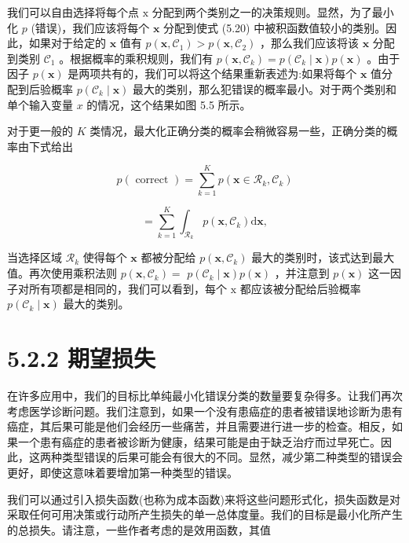 \documentclass[10pt]{article}
\begin{document}
我们可以自由选择将每个点 \(\mathrm{x}\) 分配到两个类别之一的决策规则。显然，为了最小化 \(p\) (错误)，我们应该将每个 \(\mathbf{x}\) 分配到使式 (5.20) 中被积函数值较小的类别。因此，如果对于给定的 \(\mathbf{x}\) 值有 \(p\left( {\mathbf{x},{\mathcal{C}}_{1}}\right)  > p\left( {\mathbf{x},{\mathcal{C}}_{2}}\right)\) ，那么我们应该将该 \(\mathbf{x}\) 分配到类别 \({\mathcal{C}}_{1}\) 。根据概率的乘积规则，我们有 \(p\left( {\mathbf{x},{\mathcal{C}}_{k}}\right)  = p\left( {{\mathcal{C}}_{k} \mid  \mathbf{x}}\right) p\left( \mathbf{x}\right)\) 。由于因子 \(p\left( \mathbf{x}\right)\) 是两项共有的，我们可以将这个结果重新表述为:如果将每个 \(\mathbf{x}\) 值分配到后验概率 \(p\left( {{\mathcal{C}}_{k} \mid  \mathbf{x}}\right)\) 最大的类别，那么犯错误的概率最小。对于两个类别和单个输入变量 \(x\) 的情况，这个结果如图 5.5 所示。

对于更一般的 \(K\) 类情况，最大化正确分类的概率会稍微容易一些，正确分类的概率由下式给出

\[
p\left( \text{ correct }\right)  = \mathop{\sum }\limits_{{k = 1}}^{K}p\left( {\mathbf{x} \in  {\mathcal{R}}_{k},{\mathcal{C}}_{k}}\right)
\]

\[
= \mathop{\sum }\limits_{{k = 1}}^{K}{\int }_{{\mathcal{R}}_{k}}p\left( {\mathbf{x},{\mathcal{C}}_{k}}\right) \mathrm{d}\mathbf{x}, \tag{5.21}
\]

当选择区域 \({\mathcal{R}}_{k}\) 使得每个 \(\mathbf{x}\) 都被分配给 \(p\left( {\mathbf{x},{\mathcal{C}}_{k}}\right)\) 最大的类别时，该式达到最大值。再次使用乘积法则 \(p\left( {\mathbf{x},{\mathcal{C}}_{k}}\right)  =\)  \(p\left( {{\mathcal{C}}_{k} \mid  \mathbf{x}}\right) p\left( \mathbf{x}\right)\) ，并注意到 \(p\left( \mathbf{x}\right)\) 这一因子对所有项都是相同的，我们可以看到，每个 \(\mathrm{x}\) 都应该被分配给后验概率 \(p\left( {{\mathcal{C}}_{k} \mid  \mathbf{x}}\right)\) 最大的类别。

\section*{5.2.2 期望损失}

在许多应用中，我们的目标比单纯最小化错误分类的数量要复杂得多。让我们再次考虑医学诊断问题。我们注意到，如果一个没有患癌症的患者被错误地诊断为患有癌症，其后果可能是他们会经历一些痛苦，并且需要进行进一步的检查。相反，如果一个患有癌症的患者被诊断为健康，结果可能是由于缺乏治疗而过早死亡。因此，这两种类型错误的后果可能会有很大的不同。显然，减少第二种类型的错误会更好，即使这意味着要增加第一种类型的错误。

我们可以通过引入损失函数(也称为成本函数)来将这些问题形式化，损失函数是对采取任何可用决策或行动所产生损失的单一总体度量。我们的目标是最小化所产生的总损失。请注意，一些作者考虑的是效用函数，其值
\end{document}
